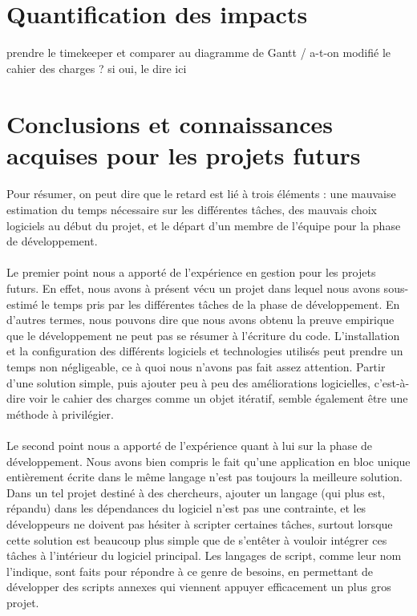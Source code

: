 \section{Quantification des impacts}

prendre le timekeeper et comparer au diagramme de Gantt / a-t-on modifié le cahier des charges ? si oui, le dire ici

\section{Conclusions et connaissances acquises pour les projets futurs}

\paragraph{}
Pour résumer, on peut dire que le retard est lié à trois éléments : une mauvaise estimation du temps nécessaire sur les différentes tâches, des mauvais choix logiciels au début du projet, et le départ d'un membre de l'équipe pour la phase de développement.

\paragraph{}
Le premier point nous a apporté de l'expérience en gestion pour les projets futurs. En effet, nous avons à présent vécu un projet dans lequel nous avons sous-estimé le temps pris par les différentes tâches de la phase de développement. En d'autres termes, nous pouvons dire que nous avons obtenu la preuve empirique que le développement ne peut pas se résumer à l'écriture du code. L'installation et la configuration des différents logiciels et technologies utilisés peut prendre un temps non négligeable, ce à quoi nous n'avons pas fait assez attention. Partir d'une solution simple, puis ajouter peu à peu des améliorations logicielles, c'est-à-dire voir le cahier des charges comme un objet itératif, semble également être une méthode à privilégier.

\paragraph{}
Le second point nous a apporté de l'expérience quant à lui sur la phase de développement. Nous avons bien compris le fait qu'une application en bloc unique entièrement écrite dans le même langage n'est pas toujours la meilleure solution. Dans un tel projet destiné à des chercheurs, ajouter un langage (qui plus est, répandu) dans les dépendances du logiciel n'est pas une contrainte, et les développeurs ne doivent pas hésiter à scripter certaines tâches, surtout lorsque cette solution est beaucoup plus simple que de s'entêter à vouloir intégrer ces tâches à l'intérieur du logiciel principal. Les langages de script, comme leur nom l'indique, sont faits pour répondre à ce genre de besoins, en permettant de développer des scripts annexes qui viennent appuyer efficacement un plus gros projet.


